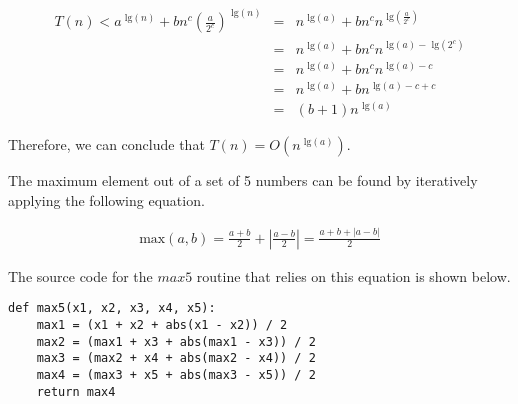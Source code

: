 \documentclass[11pt]{article}
\newcommand{\tlg}{\text{ lg}}
\begin{document}
\begin{sol}
\begin{eqnarray*}
T(n) <  a^{\tlg(n)} + bn^c(\frac{a}{2^c})^{\tlg(n)} & = & n^{\tlg(a)} + bn^cn^{\tlg(\frac{a}{2^c})} \\
& = & n^{\tlg(a)} + bn^cn^{\tlg(a) - \tlg(2^c)} \\
& = & n^{\tlg(a)} + bn^cn^{\tlg(a) - c} \\
& = & n^{\tlg(a)} + bn^{\tlg(a) - c + c} \\
& = & (b+1)n^{\tlg(a)}
\end{eqnarray*}

Therefore, we can conclude that $T(n) = O(n^{\tlg(a)})$.

\end{sol}

\begin{prob}{5}
\end{prob}
\begin{sol} 

The maximum element out of a set of 5 numbers can be found by iteratively applying the following equation.

\begin{eqnarray*}
\text{max}(a,b) = \frac{a+b}{2} + |\frac{a-b}{2}| = \frac{a + b + |a - b|}{2}
\end{eqnarray*}

The source code for the $max5$ routine that relies on this equation is shown below.

\begin{lstlisting}
def max5(x1, x2, x3, x4, x5):
	max1 = (x1 + x2 + abs(x1 - x2)) / 2
	max2 = (max1 + x3 + abs(max1 - x3)) / 2
	max3 = (max2 + x4 + abs(max2 - x4)) / 2
	max4 = (max3 + x5 + abs(max3 - x5)) / 2
	return max4
\end{lstlisting}

\end{sol}

\end{document}
